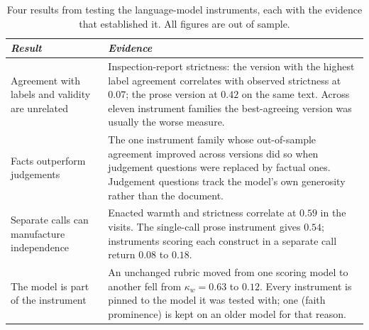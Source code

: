 \begin{table}[htbp]
\centering
\small
\caption{Four results from testing the language-model instruments, each with
the evidence that established it. All figures are out of sample.}
\label{tab:instrument_findings}
\begin{tabular}{p{4.2cm}p{9.2cm}}
\toprule
\textit{Result} & \textit{Evidence} \\
\midrule
Agreement with labels and validity are unrelated &
Inspection-report strictness: the version with the highest label agreement
correlates with observed strictness at $0.07$; the prose version at $0.42$ on the same text.
Across eleven instrument families the best-agreeing version was usually the
worse measure. \\
\addlinespace[3pt]
Facts outperform judgements &
The one instrument family whose out-of-sample agreement improved across
versions did so when judgement questions were replaced by factual ones.
Judgement questions track the model's own generosity rather than the
document. \\
\addlinespace[3pt]
Separate calls can manufacture independence &
Enacted warmth and strictness correlate at $0.59$ in the visits. The
single-call prose instrument gives $0.54$; instruments scoring
each construct in a separate call return $0.08$ to $0.18$. \\
\addlinespace[3pt]
The model is part of the instrument &
An unchanged rubric moved from one scoring model to another fell from
$\kappa_w = 0.63$ to $0.12$. Every instrument is pinned to the model it was
tested with; one (faith prominence) is kept on an older model for that reason. \\
\bottomrule
\end{tabular}
\end{table}
